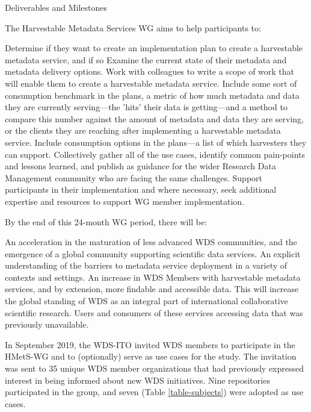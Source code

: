 \documentclass{interact}
\begin{document}
Deliverables and Milestones

The Harvestable Metadata Services WG aims to help participants to:

    Determine if they want to create an implementation plan to create a harvestable metadata service, and if so
    Examine the current state of their metadata and metadata delivery options.
    Work with colleagues to write a scope of work that will enable them to create a harvestable metadata service.
    Include some sort of consumption benchmark in the plans, a metric of how much metadata and data they are currently serving—the 'hits' their data is getting—and a method to compare this number against the amount of metadata and data they are serving, or the clients they are reaching after implementing a harvestable metadata service.
    Include consumption options in the plans—a list of which harvesters they can support.
    Collectively gather all of the use cases, identify common pain-points and lessons learned, and publish as guidance for the wider Research Data Management community who are facing the same challenges.
    Support participants in their implementation and where necessary, seek additional expertise and resources to support WG member implementation.



By the end of this 24-month WG period, there will be:

    An acceleration in the maturation of less advanced WDS communities, and the emergence of a global community supporting scientific data services.
    An explicit understanding of the barriers to metadata service deployment in a variety of contexts and settings.
    An increase in WDS Members with harvestable metadata services, and by extension, more findable and accessible data. This will increase the global standing of WDS as an integral part of international collaborative scientific research.
    Users and consumers of these services accessing data that was previously unavailable.



In September 2019, the WDS-ITO invited WDS members to participate in the HMetS-WG and to (optionally) serve as use cases for the study. The invitation was sent to 35 unique WDS member organizations that had previously expressed interest in being informed about new WDS initiatives. Nine repositories participated in the group, and seven (Table \ref{table-subjects}) were adopted as use cases. 
\end{document}
